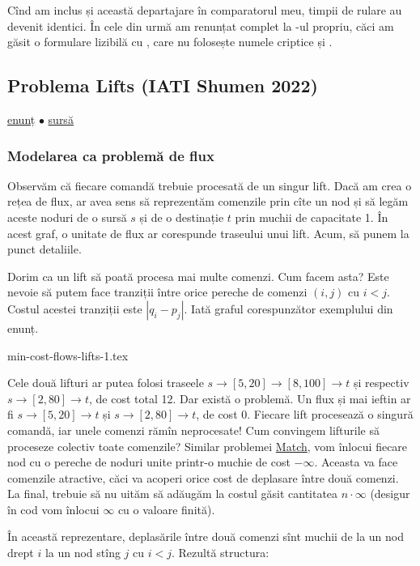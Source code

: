 \documentclass[../main.tex]{subfiles}
\begin{document}
Cînd am inclus și această departajare în comparatorul meu, timpii de rulare au devenit identici. În cele din urmă am renunțat complet la -ul propriu, căci am găsit o formulare lizibilă cu , care nu folosește numele criptice  și .


\subsection{Problema Lifts (IATI Shumen 2022)}
\label{problem:lifts}

\href{https://kilonova.ro/problems/317}{enunț}
$\bullet$
\hyperref[code:lifts]{sursă}

\subsubsection*{Modelarea ca problemă de flux}

Observăm că fiecare comandă trebuie procesată de un singur lift. Dacă am crea o rețea de flux, ar avea sens să reprezentăm comenzile prin cîte un nod și să legăm aceste noduri de o sursă $s$ și de o destinație $t$ prin muchii de capacitate 1. În acest graf, o unitate de flux ar corespunde traseului unui lift. Acum, să punem la punct detaliile.

Dorim ca un lift să poată procesa mai multe comenzi. Cum facem asta? Este nevoie să putem face tranziții între orice pereche de comenzi $(i, j)$ cu $i < j$. Costul acestei tranziții este $|q_i - p_j|$. Iată graful corespunzător exemplului din enunț.

{min-cost-flows-lifts-1.tex}

Cele două lifturi ar putea folosi traseele $s \to [5,20] \to [8,100] \to t$ și respectiv $s \to [2,80] \to t$, de cost total 12. Dar există o problemă. Un flux și mai ieftin ar fi $s \to [5,20] \to t$ și $s \to [2,80] \to t$, de cost 0. Fiecare lift procesează o singură comandă, iar unele comenzi rămîn neprocesate! Cum convingem lifturile să proceseze colectiv toate comenzile? Similar problemei \hyperref[problem:match]{Match}, vom înlocui fiecare nod cu o pereche de noduri unite printr-o muchie de cost $-\infty$. Aceasta va face comenzile atractive, căci va acoperi orice cost de deplasare între două comenzi. La final, trebuie să nu uităm să adăugăm la costul găsit cantitatea $n \cdot \infty$ (desigur în cod vom înlocui $\infty$ cu o valoare finită).

În această reprezentare, deplasările între două comenzi sînt muchii de la un nod drept $i$ la un nod stîng $j$ cu $i < j$. Rezultă structura:
\end{document}

